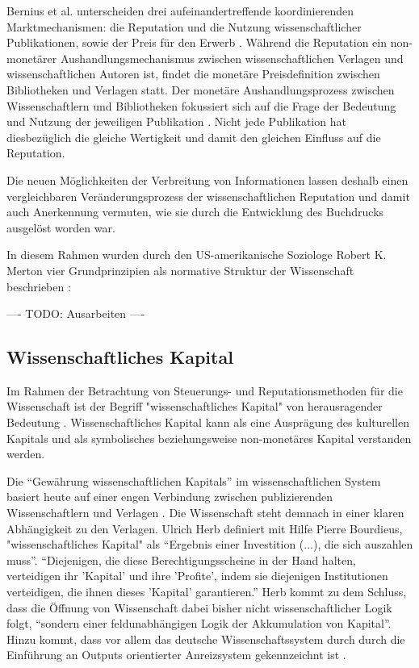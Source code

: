 Bernius et al. unterscheiden drei aufeinandertreffende koordinierenden Marktmechanismen: die Reputation und die Nutzung wissenschaftlicher Publikationen, sowie der Preis für den Erwerb \cite{suchen}. Während die Reputation ein non-monetärer Aushandlungsmechanismus zwischen wissenschaftlichen Verlagen und wissenschaftlichen Autoren ist, findet die monetäre Preisdefinition zwischen Bibliotheken und Verlagen statt. Der monetäre Aushandlungsprozess zwischen Wissenschaftlern und Bibliotheken fokussiert sich auf die Frage der Bedeutung und Nutzung der jeweiligen Publikation \cite{cite:21a}. Nicht jede Publikation hat diesbezüglich die gleiche Wertigkeit \cite{suchen} und damit den gleichen Einfluss auf die Reputation. 

Die neuen Möglichkeiten der Verbreitung von Informationen lassen deshalb einen vergleichbaren Veränderungsprozess der wissenschaftlichen Reputation und damit auch Anerkennung vermuten, wie sie durch die Entwicklung des Buchdrucks ausgelöst worden war.\cite{hanekop_2006} 

In diesem Rahmen wurden durch den US-amerikanische Soziologe Robert K. Merton vier Grundprinzipien als normative Struktur der Wissenschaft beschrieben \cite{Merton_1985}:

---- TODO: Ausarbeiten ----

\subsection{Wissenschaftliches Kapital}
Im Rahmen der Betrachtung von Steuerungs- und Reputationsmethoden für die Wissenschaft ist der Begriff "wissenschaftliches Kapital" von herausragender Bedeutung \cite{suchen}. Wissenschaftliches Kapital kann als eine Ausprägung des kulturellen Kapitals und als symbolisches beziehungsweise non-monetäres Kapital \cite{irmer2011} verstanden werden. 

Die “Gewährung wissenschaftlichen Kapitals” im wissenschaftlichen System basiert heute auf einer engen Verbindung zwischen publizierenden Wissenschaftlern und Verlagen \cite{herb_2006}. Die Wissenschaft steht demnach in einer klaren Abhängigkeit zu den Verlagen. Ulrich Herb definiert mit Hilfe Pierre Bourdieus, "wissenschaftliches Kapital" als “Ergebnis einer Investition (...), die sich auszahlen muss”. “Diejenigen, die diese Berechtigungsscheine in der Hand halten, verteidigen ihr 'Kapital' und ihre 'Profite', indem sie diejenigen Institutionen verteidigen, die ihnen dieses 'Kapital' garantieren.” \cite{Bourdieu_1992} Herb kommt zu dem Schluss, dass die Öffnung von Wissenschaft dabei bisher nicht wissenschaftlicher Logik folgt, “sondern einer feldunabhängigen Logik der Akkumulation von Kapital”\cite{herb_2006}. Hinzu kommt, dass vor allem das deutsche Wissenschaftssystem durch durch die Einführung an Outputs orientierter Anreizsystem gekennzeichnt ist \cite{osterloh2008anreize}.

